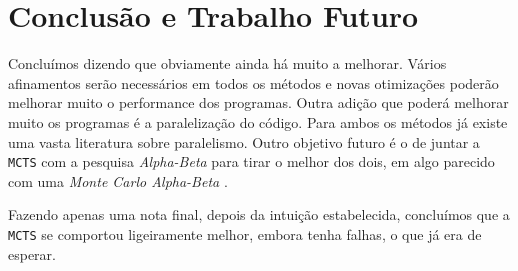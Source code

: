 \documentclass[12pt,a4paper,oneside]{article}
\begin{document}
\section{Conclusão e Trabalho Futuro}
\label{sec:conc}


Concluímos dizendo que obviamente ainda há muito a melhorar. Vários
afinamentos serão necessários em todos os métodos e novas otimizações
poderão melhorar muito o performance dos programas. Outra adição que
poderá melhorar muito os programas é a paralelização do código. Para
ambos os métodos já existe uma vasta literatura sobre
paralelismo. Outro objetivo futuro é o de juntar a \texttt{MCTS} com a
pesquisa \textit{Alpha-Beta} para tirar o melhor dos dois, em algo
parecido com uma \textit{Monte Carlo Alpha-Beta} \cite{Winands:2011}.

Fazendo apenas uma nota final, depois da intuição estabelecida,
concluímos que a \texttt{MCTS} se comportou ligeiramente melhor,
embora tenha falhas, o que já era de esperar.



\end{document}
